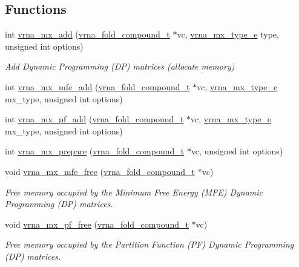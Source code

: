 \subsection*{Functions}
\begin{DoxyCompactItemize}
\item 
int \mbox{\hyperlink{group__dp__matrices_ga08661f098008961dab0023bf300f0c33}{vrna\+\_\+mx\+\_\+add}} (\mbox{\hyperlink{group__fold__compound_ga1b0cef17fd40466cef5968eaeeff6166}{vrna\+\_\+fold\+\_\+compound\+\_\+t}} $\ast$vc, \mbox{\hyperlink{group__dp__matrices_ga6042ea1d58d01931e959791be6d89343}{vrna\+\_\+mx\+\_\+type\+\_\+e}} type, unsigned int options)
\begin{DoxyCompactList}\small\item\em Add Dynamic Programming (DP) matrices (allocate memory) \end{DoxyCompactList}\item 
int \mbox{\hyperlink{group__dp__matrices_ga0b29f2a8a5632879014a80d51b334374}{vrna\+\_\+mx\+\_\+mfe\+\_\+add}} (\mbox{\hyperlink{group__fold__compound_ga1b0cef17fd40466cef5968eaeeff6166}{vrna\+\_\+fold\+\_\+compound\+\_\+t}} $\ast$vc, \mbox{\hyperlink{group__dp__matrices_ga6042ea1d58d01931e959791be6d89343}{vrna\+\_\+mx\+\_\+type\+\_\+e}} mx\+\_\+type, unsigned int options)
\item 
int \mbox{\hyperlink{group__dp__matrices_gaf80ade1ec97fc158875736e69eff999f}{vrna\+\_\+mx\+\_\+pf\+\_\+add}} (\mbox{\hyperlink{group__fold__compound_ga1b0cef17fd40466cef5968eaeeff6166}{vrna\+\_\+fold\+\_\+compound\+\_\+t}} $\ast$vc, \mbox{\hyperlink{group__dp__matrices_ga6042ea1d58d01931e959791be6d89343}{vrna\+\_\+mx\+\_\+type\+\_\+e}} mx\+\_\+type, unsigned int options)
\item 
int \mbox{\hyperlink{group__dp__matrices_ga35e1fa4fdab869abb14f06ba5a3ba5b4}{vrna\+\_\+mx\+\_\+prepare}} (\mbox{\hyperlink{group__fold__compound_ga1b0cef17fd40466cef5968eaeeff6166}{vrna\+\_\+fold\+\_\+compound\+\_\+t}} $\ast$vc, unsigned int options)
\item 
void \mbox{\hyperlink{group__dp__matrices_ga6a9422feb5dfe5c64050cebf447672d0}{vrna\+\_\+mx\+\_\+mfe\+\_\+free}} (\mbox{\hyperlink{group__fold__compound_ga1b0cef17fd40466cef5968eaeeff6166}{vrna\+\_\+fold\+\_\+compound\+\_\+t}} $\ast$vc)
\begin{DoxyCompactList}\small\item\em Free memory occupied by the Minimum Free Energy (M\+FE) Dynamic Programming (DP) matrices. \end{DoxyCompactList}\item 
void \mbox{\hyperlink{group__dp__matrices_ga2283e69fd139fb8e58d7ade3b5773f9c}{vrna\+\_\+mx\+\_\+pf\+\_\+free}} (\mbox{\hyperlink{group__fold__compound_ga1b0cef17fd40466cef5968eaeeff6166}{vrna\+\_\+fold\+\_\+compound\+\_\+t}} $\ast$vc)
\begin{DoxyCompactList}\small\item\em Free memory occupied by the Partition Function (PF) Dynamic Programming (DP) matrices. \end{DoxyCompactList}\end{DoxyCompactItemize}


